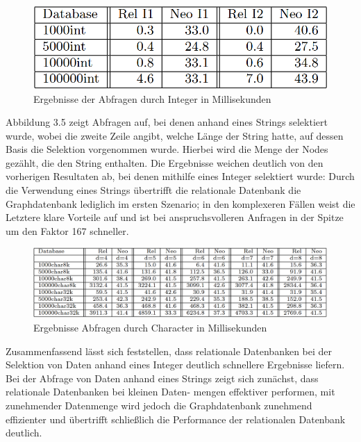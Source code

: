  \citep{graphrelationaldb}
\begin{figure}[H]
	\centering
	\includegraphics[scale=.5]{Illustrations/dbresultsint.png}
	\caption{Ergebnisse der Abfragen durch Integer in Millisekunden \citep{graphrelationaldb}}
\end{figure}
\noindent
Abbildung 3.5 zeigt Abfragen auf, bei denen anhand eines Strings selektiert wurde, wobei die zweite Zeile angibt, welche Länge der String hatte, auf dessen Basis die Selektion vorgenommen wurde. Hierbei wird die Menge der Nodes gezählt, die den String enthalten. Die Ergebnisse weichen deutlich von den vorherigen Resultaten ab, bei denen mithilfe eines Integer selektiert wurde: Durch die Verwendung eines Strings übertrifft die relationale Datenbank die Graphdatenbank lediglich im ersten Szenario; in den komplexeren Fällen weist die Letztere klare Vorteile auf und ist bei anspruchsvolleren Anfragen in der Spitze um den Faktor 167 schneller. 
 \citep{graphrelationaldb}
\begin{figure}[H]
	\centering
	\includegraphics[scale=.425]{Illustrations/dbresultschar.png}
	\caption{Ergebnisse Abfragen durch Character  in Millisekunden \citep{graphrelationaldb}}
\end{figure}
\noindent
Zusammenfassend lässt sich feststellen, dass relationale Datenbanken bei der Selektion von Daten anhand eines Integer deutlich schnellere Ergebnisse liefern. Bei der Abfrage von Daten anhand eines Strings zeigt sich zunächst, dass relationale Datenbanken bei kleinen Daten- mengen effektiver performen, mit zunehmender Datenmenge wird jedoch die Graphdatenbank zunehmend effizienter und übertrifft schließlich die Performance der relationalen Datenbank deutlich.
